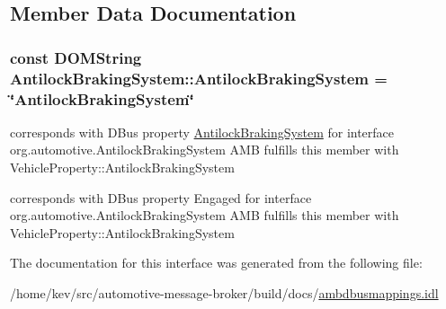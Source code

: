 \subsection{Member Data Documentation}
\hypertarget{interfaceAntilockBrakingSystem_ac981fc778ed33a1628e5702244449ec4}{
\subsubsection[{Antilock\+Braking\+System}]{\setlength{\rightskip}{0pt plus 5cm}const D\+O\+M\+String Antilock\+Braking\+System\+::\+Antilock\+Braking\+System = \char`\"{}Antilock\+Braking\+System\char`\"{}}}\label{interfaceAntilockBrakingSystem_ac981fc778ed33a1628e5702244449ec4}


corresponds with D\+Bus property \hyperlink{interfaceAntilockBrakingSystem}{Antilock\+Braking\+System} for interface org.\+automotive.\+Antilock\+Braking\+System A\+M\+B fulfills this member with Vehicle\+Property\+::\+Antilock\+Braking\+System 

corresponds with D\+Bus property Engaged for interface org.\+automotive.\+Antilock\+Braking\+System A\+M\+B fulfills this member with Vehicle\+Property\+::\+Antilock\+Braking\+System 

The documentation for this interface was generated from the following file\+:\begin{DoxyCompactItemize}
\item 
/home/kev/src/automotive-\/message-\/broker/build/docs/\hyperlink{ambdbusmappings_8idl}{ambdbusmappings.\+idl}\end{DoxyCompactItemize}
